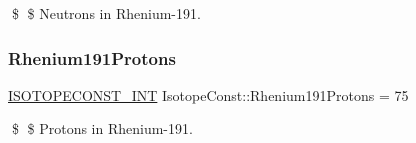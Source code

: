 \$ \$ Neutrons in Rhenium-\/191. \mbox{\label{group___isotope_const-_rhenium-_re191_gafa442f2777932b806c14149988ae4872}} 
\subsubsection{\texorpdfstring{Rhenium191\+Protons}{Rhenium191Protons}}
{\footnotesize\ttfamily \mbox{\hyperlink{group___isotope_const-_macros_ga5f18360b3e99483a35c32d789e62621c}{I\+S\+O\+T\+O\+P\+E\+C\+O\+N\+S\+T\+\_\+\+I\+NT}} Isotope\+Const\+::\+Rhenium191\+Protons = 75}

\$ \$ Protons in Rhenium-\/191. 